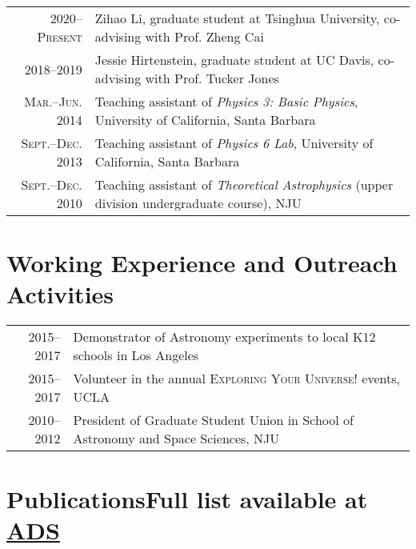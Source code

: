 \documentclass[letterpaper,10pt]{article}
\begin{document}
\begin{tabular}{rp{5.4in}}
\textsc{\small 2020--Present}  & Zihao Li, graduate student at Tsinghua University, co-advising with Prof. Zheng Cai    \\
\textsc{\small 2018--2019}  & Jessie Hirtenstein, graduate student at UC Davis, co-advising with Prof. Tucker Jones    \\
\textsc{\small Mar.--Jun. 2014}  & Teaching assistant of \textit{Physics 3: Basic Physics}, University of California, Santa Barbara \\
\textsc{\small Sept.--Dec. 2013}  & Teaching assistant of \textit{Physics 6 Lab}, University of California, Santa Barbara \\
\textsc{\small Sept.--Dec. 2010}  & Teaching assistant of \textit{Theoretical Astrophysics} (upper division undergraduate course), NJU
\end{tabular}

\section{Working Experience and Outreach Activities}

\begin{tabular}{rp{5.4in}}
\textsc{2015--2017}  & Demonstrator of Astronomy experiments to local K12 schools in Los Angeles    \\
\textsc{2015--2017}  & Volunteer in the annual \textsc{Exploring Your Universe!} events, UCLA   \\
\textsc{2010--2012}  & President of Graduate Student Union in School of Astronomy and Space Sciences, NJU
\end{tabular}



\section{Publications\hfill Full list available at \href{https://ui.adsabs.harvard.edu/public-libraries/D2s74Q15TomjQ7uGtxK5gQ}{ADS}}
\end{document}
